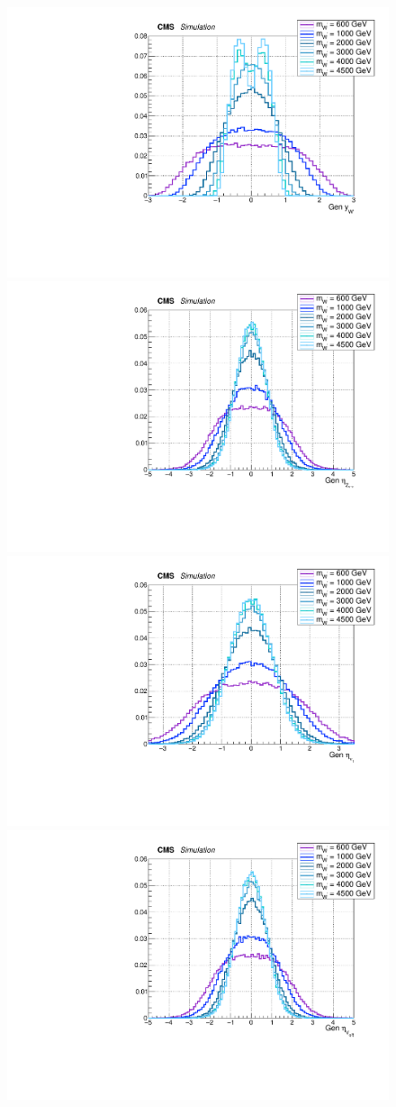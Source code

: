  \begin{figure}[!htb]
   \begin{center}
     \includegraphics[width=.495\textwidth]{Gen_v9/XWZInv_g_XRapidity.pdf}%
     \\
     \includegraphics[width=.495\textwidth]{Gen_v9/XWZInv_g_ZLepEta.pdf}%
     \includegraphics[width=.495\textwidth]{Gen_v9/XWZInv_g_Lep1Eta.pdf}%
     \\
     \includegraphics[width=.495\textwidth]{Gen_v9/XWZInv_g_VHadEta.pdf}%

\end{center}
\end{figure}

